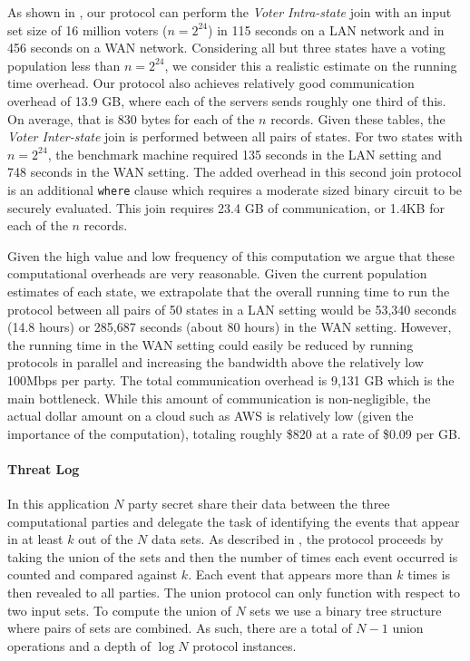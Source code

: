 As shown in , our  protocol can perform the \emph{Voter Intra-state} join with an input set size of 16 million voters ($n=2^{24}$) in 115 seconds on a LAN network and in 456 seconds on a WAN network. Considering all but three states have a voting population less than $n=2^{24}$, we consider this a realistic estimate on the running time overhead. Our protocol also achieves relatively good communication overhead of 13.9 GB, where each of the servers sends roughly one third of this. On average, that is 830 bytes for each of the $n$ records. Given these tables, the \emph{Voter Inter-state} join is performed between all pairs of states. For two states with $n=2^{24}$, the benchmark machine required 135 seconds in the LAN setting and 748 seconds in the WAN setting. The added overhead in this second join protocol is an additional \texttt{where} clause which requires a moderate sized binary circuit to be securely evaluated. This join requires 23.4 GB of communication, or 1.4KB for each of the $n$ records.

Given the high value and low frequency of this computation we argue that these computational overheads are very reasonable. Given the current population estimates of each state, we extrapolate that the overall running time to run the protocol between all pairs of 50 states in a LAN setting would be 53,340 seconds (14.8 hours) or  285,687 seconds (about 80 hours) in the WAN setting. However, the running time in the WAN setting could easily be reduced by running protocols in parallel and increasing the bandwidth above the relatively low 100Mbps per party. The total communication overhead is 9,131 GB which is the main bottleneck.  While this amount of communication is non-negligible, the actual dollar amount on a cloud such as AWS\cite{aws} is relatively low (given the importance of the computation), totaling roughly \$820 at a rate of \$0.09 per GB\cite{aws_pricing}. 


\paragraph{Threat Log} In this application $N$ party secret share their data between the three computational parties and delegate the task of identifying the events that appear in at least $k$ out of the $N$ data sets. As described in , the protocol proceeds by taking the union of the sets and then the number of times each event occurred is counted and compared against $k$. Each event that appears more than $k$ times is then revealed to all parties. The union protocol can only function with respect to two input sets. To compute the union of $N$ sets we use a binary tree structure where pairs of sets are combined. As such, there are a total of $N-1$ union operations and a depth of $\log N$ protocol instances.

